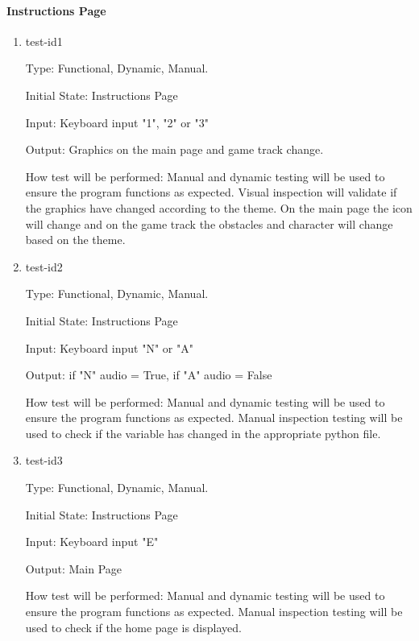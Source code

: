 \documentclass[12pt, titlepage]{article}
\begin{document}
	\paragraph{Instructions Page}
	
	\begin{enumerate}
		
		\item{test-id1\\}
		
		Type: Functional, Dynamic, Manual. 
		
		Initial State: Instructions Page
		
		Input: Keyboard input "1", "2" or "3" 
		
		Output: Graphics on the main page and game track change. 
		
		How test will be performed: Manual and dynamic testing will be used to ensure the program functions as expected. Visual inspection will validate if the graphics have changed according to the theme. On the main page the icon will change and on the game track the obstacles and character will change based on the theme. 
		
		\item{test-id2\\}
		
		Type: Functional, Dynamic, Manual.
		
		Initial State: Instructions Page
		
		Input: Keyboard input "N" or "A" 
		
		Output: if "N" audio = True, if "A" audio = False
		
		How test will be performed: Manual and dynamic testing will be used to ensure the program functions as expected. Manual inspection testing will be used to check if the variable has changed in the appropriate python file. 
		
		\item{test-id3\\}
		
		Type: Functional, Dynamic, Manual.
		
		Initial State: Instructions Page
		
		Input: Keyboard input "E"
		
		Output: Main Page
		
		How test will be performed: Manual and dynamic testing will be used to ensure the program functions as expected. Manual inspection testing will be used to check if the home page is displayed. 
		
	\end{enumerate}
	
\end{document}
